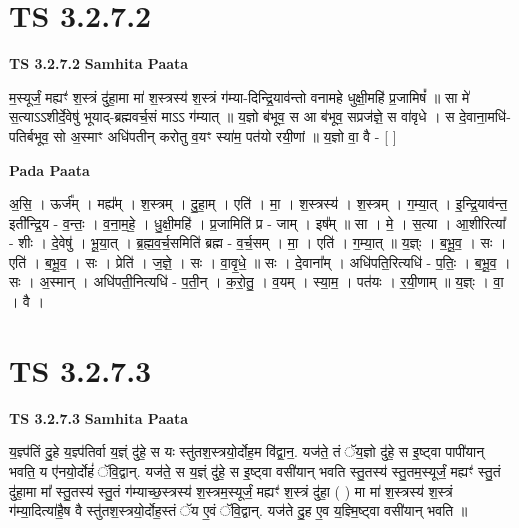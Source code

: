 \documentclass[17pt]{extarticle}
\begin{document}
\section*{ TS 3.2.7.2 }

\textbf{TS 3.2.7.2 } \newline
\textbf{Samhita Paata} \newline

म॒स्यूर्जं॒ मह्यꣳ॑ श॒स्त्रं दु॑हा॒मा मा॑ श॒स्त्रस्य॑ श॒स्त्रं ग॑म्या-दिन्द्रि॒याव॑न्तो वनामहे धुक्षी॒महि॑ प्र॒जामिषं᳚ ॥ सा मे॑ स॒त्याऽऽशीर्दे॒वेषु॑ भूयाद्-ब्रह्मवर्च॒सं माऽऽ ग॑म्यात् ॥ य॒ज्ञो ब॑भूव॒ स आ ब॑भूव॒ सप्रज॑ज्ञे॒ स वा॑वृधे । स दे॒वाना॒मधि॑-पतिर्बभूव॒ सो अ॒स्माꣳ अधि॑पतीन् करोतु व॒यꣳ स्या॑म॒ पत॑यो रयी॒णां ॥ य॒ज्ञो वा॒ वै - [  ] \newline

\textbf{Pada Paata} \newline

अ॒सि॒ । ऊर्ज᳚म् । मह्य᳚म् । श॒स्त्रम् । दु॒हा॒म् । एति॑ । मा॒ । श॒स्त्रस्य॑ । श॒स्त्रम् । ग॒म्या॒त् । इ॒न्द्रि॒याव॑न्त॒ इती᳚न्द्रि॒य - व॒न्तः॒ । व॒ना॒म॒हे॒ । धु॒क्षी॒महि॑ । प्र॒जामिति॑ प्र - जाम् । इष᳚म् ॥ सा । मे॒ । स॒त्या । आ॒शीरित्या᳚ - शीः । दे॒वेषु॑ । भू॒या॒त् । ब्र॒ह्म॒व॒र्च॒समिति॑ ब्रह्म - व॒र्च॒सम् । मा॒ । एति॑ । ग॒म्या॒त् ॥ य॒ज्ञ्ः । ब॒भू॒व॒ । सः । एति॑ । ब॒भू॒व॒ । सः । प्रेति॑ । ज॒ज्ञे॒ । सः । वा॒वृ॒धे॒ ॥ सः । दे॒वाना᳚म् । अधि॑पति॒रित्यधि॑ - प॒तिः॒ । ब॒भू॒व॒ । सः । अ॒स्मान् । अधि॑पती॒नित्यधि॑ - प॒ती॒न् । क॒रो॒तु॒ । व॒यम् । स्या॒म॒ । पत॑यः । र॒यी॒णाम् ॥ य॒ज्ञ्ः । वा॒ । वै ।  \newline




\section*{ TS 3.2.7.3 }

\textbf{TS 3.2.7.3 } \newline
\textbf{Samhita Paata} \newline

य॒ज्ञ्प॑तिं दु॒हे य॒ज्ञ्प॑तिर्वा य॒ज्ञ्ं दु॑हे॒ स यः स्तु॑तश॒स्त्रयो॒र्दोह॒म वि॑द्वा॒न॒. यज॑ते॒ तं ॅय॒ज्ञो दु॑हे॒ स इ॒ष्ट्वा पापी॑यान् भवति॒ य ए॑नयो॒र्दोहं॑ ॅवि॒द्वान्. यज॑ते॒ स य॒ज्ञ्ं दु॑हे॒ स इ॒ष्ट्वा वसी॑यान् भवति स्तु॒तस्य॑ स्तु॒तम॒स्यूर्जं॒ मह्यꣳ॑ स्तु॒तं दु॑हा॒मा मा᳚ स्तु॒तस्य॑ स्तु॒तं ग॑म्याच्छ॒स्त्रस्य॑ श॒स्त्रम॒स्यूर्जं॒ मह्यꣳ॑ श॒स्त्रं दु॑हा॒ ( ) मा मा॑ श॒स्त्रस्य॑ श॒स्त्रं ग॑म्या॒दित्या॑है॒ष वै स्तु॑तश॒स्त्रयो॒र्दोह॒स्तं ॅय ए॒वं ॅवि॒द्वान्. यज॑ते दु॒ह ए॒व य॒ज्ञ्मि॒ष्ट्वा वसी॑यान् भवति ॥ \newline
\end{document}
